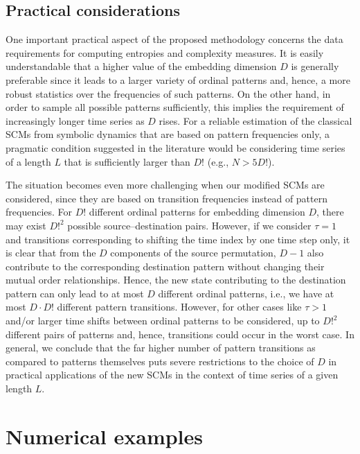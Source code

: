 \documentclass[aip,cha,reprint,nofootinbib]{revtex4-1}
\begin{document}
{\color{red}
\subsection{Practical considerations}\label{sec:tslength}

One important practical aspect of the proposed methodology concerns the data requirements for computing entropies and complexity measures. It is easily understandable that a higher value of the embedding dimension $D$ is generally preferable since it leads to a larger variety of ordinal patterns and, hence, a more robust statistics over the frequencies of such patterns. On the other hand, in order to sample all possible patterns sufficiently, this implies the requirement of increasingly longer time series as $D$ rises. For a reliable estimation of the classical SCMs from symbolic dynamics that are based on pattern frequencies only, a pragmatic condition suggested in the literature would be considering time series of a length $L$ that is sufficiently larger than $D!$ \cite{rossoPRL2007,kowalskiPhyD2007} (e.g., $N>5D!$). 

The situation becomes even more challenging when our modified SCMs are considered, since they are based on transition frequencies instead of pattern frequencies. For $D!$ different ordinal patterns for embedding dimension $D$, there may exist $D!^2$ possible source--destination pairs. However, if we consider $\tau=1$ and transitions corresponding to shifting the time index by one time step only, it is clear that from the $D$ components of the source permutation, $D-1$ also contribute to the corresponding destination pattern without changing their mutual order relationships. Hence, the new state contributing to the destination pattern can only lead to at most $D$ different ordinal patterns, i.e., we have at most $D\cdot D!$ different pattern transitions. However, for other cases like $\tau>1$ and/or larger time shifts between ordinal patterns to be considered, up to $D!^2$ different pairs of patterns and, hence, transitions could occur in the worst case. In general, we conclude that the far higher number of pattern transitions as compared to patterns themselves puts severe restrictions to the choice of $D$ in practical applications of the new SCMs in the context of time series of a given length $L$.
}


\section{Numerical examples}\label{sec:results1}
\end{document}
